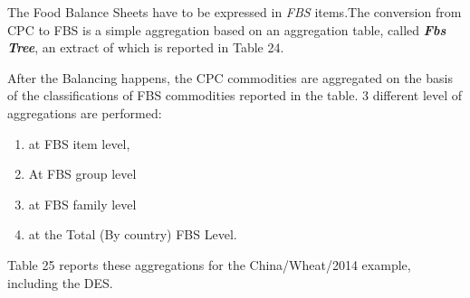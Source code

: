 \documentclass[]{article}
\providecommand{\tightlist}{%
  \setlength{\itemsep}{0pt}\setlength{\parskip}{0pt}}
\begin{document}
The Food Balance Sheets have to be expressed in \emph{FBS} items.The
conversion from CPC to FBS is a simple aggregation based on an
aggregation table, called \textbf{\emph{Fbs Tree}}, an extract of which
is reported in Table 24.

After the Balancing happens, the CPC commodities are aggregated on the
basis of the classifications of FBS commodities reported in the table. 3
different level of aggregations are performed:

\begin{enumerate}
\def\labelenumi{\arabic{enumi}.}
\tightlist
\item
  at FBS item level,
\item
  At FBS group level
\item
  at FBS family level
\item
  at the Total (By country) FBS Level.
\end{enumerate}

Table 25 reports these aggregations for the China/Wheat/2014 example,
including the DES.
\end{document}
